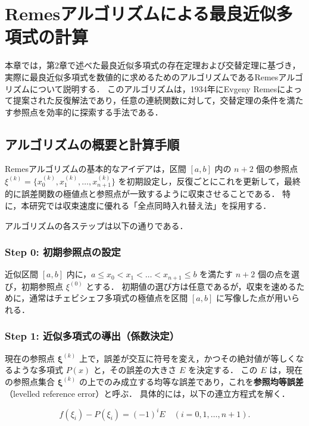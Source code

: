 \section{Remesアルゴリズムによる最良近似多項式の計算}
\label{sec:remes_algorithm}

本章では，第2章で述べた最良近似多項式の存在定理および交替定理に基づき，実際に最良近似多項式を数値的に求めるためのアルゴリズムであるRemesアルゴリズムについて説明する．
このアルゴリズムは，1934年にEvgeny Remesによって提案された反復解法であり，任意の連続関数に対して，交替定理の条件を満たす参照点を効率的に探索する手法である．

\subsection{アルゴリズムの概要と計算手順}
\label{subsec:algo_overview}

Remesアルゴリズムの基本的なアイデアは，区間 $[a, b]$ 内の $n+2$ 個の参照点 $\xi^{(k)} = \{x_0^{(k)}, x_1^{(k)}, \dots, x_{n+1}^{(k)}\}$ を初期設定し，反復ごとにこれを更新して，最終的に誤差関数の極値点と参照点が一致するように収束させることである．
特に，本研究では収束速度に優れる「全点同時入れ替え法」を採用する．

アルゴリズムの各ステップは以下の通りである．

\subsubsection{Step 0: 初期参照点の設定}
近似区間 $[a, b]$ 内に，$a \le x_0 < x_1 < \dots < x_{n+1} \le b$ を満たす $n+2$ 個の点を選び，初期参照点 $\xi^{(0)}$ とする．
初期値の選び方は任意であるが，収束を速めるために，通常はチェビシェフ多項式の極値点を区間 $[a, b]$ に写像した点が用いられる．

\subsubsection{Step 1: 近似多項式の導出（係数決定）}
現在の参照点 $\boldsymbol{\xi}^{(k)}$ 上で，誤差が交互に符号を変え，かつその絶対値が等しくなるような多項式 $P(x)$ と，その誤差の大きさ $E$ を決定する．
この $E$ は，現在の参照点集合 $\boldsymbol{\xi}^{(k)}$ の上でのみ成立する均等な誤差であり，これを\textbf{参照均等誤差}（levelled reference error）と呼ぶ\cite{seminar-note}．
具体的には，以下の連立方程式を解く．

\begin{equation}
    f(\xi_i) - P(\xi_i) = (-1)^i E \quad (i = 0, 1, \dots, n+1).
    \label{eq:remes_linear_system}
\end{equation}

